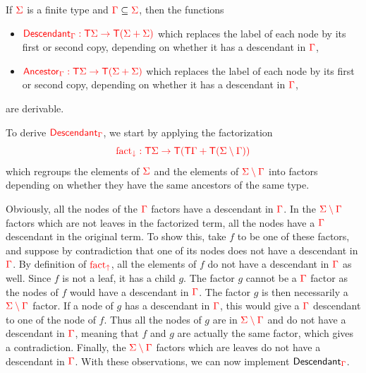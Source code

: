 \noindent\begin{example}\label{ex:descendant} If ${\color{red}{\Sigma}}$ is a finite type and ${\color{red}{\Gamma}}\subseteq {\color{red}{\Sigma}}$, then the functions 
\begin{itemize}
\item ${\color{red}{\mathsf{Descendant}_{\color{red}{\Gamma}}: {\color{red}{\mathsf T}}{\color{red}{\Sigma}}\to {\color{red}{\mathsf T}}({\color{red}{\Sigma}}+{\color{red}{\Sigma}})}}$ which replaces the label of each node by its first or second copy, depending on whether it has a descendant in ${\color{red}{\Gamma}}$,
\item ${\color{red}{\mathsf{Ancestor}_{\color{red}{\Gamma}}: {\color{red}{\mathsf T}}{\color{red}{\Sigma}}\to {\color{red}{\mathsf T}}({\color{red}{\Sigma}}+{\color{red}{\Sigma}})}}$ which replaces the label of each node by its first or second copy, depending on whether it has a descendant in ${\color{red}{\Gamma}}$,
\end{itemize}
are derivable.

To derive ${\color{red}{\mathsf{Descendant}_{\color{red}{\Gamma}}}}$, we start by applying the factorization $${\color{red}{{\color{red}{\mathrm{fact_{\downarrow}}}}: {\color{red}{\mathsf T}}{\color{red}{\Sigma}}\to {\color{red}{\mathsf T}}({\color{red}{\mathsf T}}{\color{red}{\Gamma}}+{\color{red}{\mathsf T}}({\color{red}{\Sigma}}\setminus{\color{red}{\Gamma}}))}}$$ which regroups the elements of ${\color{red}{\Sigma}}$ and the elements of ${\color{red}{{\color{red}{\Sigma}}\setminus{\color{red}{\Gamma}}}}$ into factors depending on whether they have the same ancestors of the same type.

Obviously, all the nodes of the ${\color{red}{\Gamma}}$ factors have a descendant in ${\color{red}{\Gamma}}$. 
In the ${\color{red}{{\color{red}{\Sigma}}\setminus{\color{red}{\Gamma}}}}$ factors which are not leaves in the factorized term, all the nodes have a ${\color{red}{\Gamma}}$ descendant in the original term. To show this, take $f$ to be one of these factors, and suppose by contradiction that one of its nodes does not have a descendant in ${\color{red}{\Gamma}}$. By definition of ${\color{red}{\mathrm{fact_{\uparrow}}}}$, all the elements of $f$ do not have a descendant in ${\color{red}{\Gamma}}$ as well. Since $f$ is not a leaf, it has a child $g$. The factor $g$ cannot be a ${\color{red}{\Gamma}}$
factor as the nodes of $f$ would have a descendant in ${\color{red}{\Gamma}}$. The factor $g$ is then necessarily  a ${\color{red}{{\color{red}{\Sigma}}\setminus {\color{red}{\Gamma}}}}$ factor. If a node of $g$ has a descendant in ${\color{red}{\Gamma}}$, this would give a ${\color{red}{\Gamma}}$ descendant to one of the node of $f$. Thus all the nodes of $g$ are in ${\color{red}{{\color{red}{\Sigma}}\setminus {\color{red}{\Gamma}}}}$ and do not have a descendant in ${\color{red}{\Gamma}}$, meaning that $f$ and $g$ are actually the same factor, which gives a contradiction. Finally, the ${\color{red}{{\color{red}{\Sigma}}\setminus{\color{red}{\Gamma}}}}$ factors which are leaves do not have a descendant in ${\color{red}{\Gamma}}$. With these observations, we can now implement $\mathsf{Descendant}_{\color{red}{\Gamma}}$. 


\end{example}
